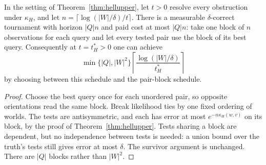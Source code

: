 \begin{theorem}
\label{thm:sharedtests}
In the setting of Theorem~\ref{thm:hellupper}, let $t>0$ resolve every obstruction under
$\kappa_H$, and let $n=\lceil\log(|W|/\delta)/t\rceil$.
There is a measurable $\delta$-correct tournament with horizon $|Q|n$ and paid cost at most
$|Q|n$: take one block of $n$ observations for each query and let every tested pair use the
block of its best query. Consequently at $t=t_H^*>0$ one can achieve
\[
\min\{|Q|,|W|^2\}\left\lceil\frac{\log(|W|/\delta)}{t_H^*}\right\rceil
\]
by choosing between this schedule and the pair-block schedule.
\end{theorem}
\begin{proof}
Choose the best query once for each unordered pair, so opposite orientations read the same
block. Break likelihood ties by one fixed ordering of worlds. The tests are antisymmetric,
and each has error at most $e^{-n\kappa_H(w,v)}$ on its block, by the proof of
Theorem~\ref{thm:hellupper}. Tests sharing a block are dependent, but no independence between
tests is needed: a union bound over the truth's tests still gives error at most $\delta$.
The survivor argument is unchanged. There are $|Q|$ blocks rather than $|W|^2$.
\end{proof}

